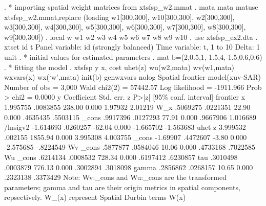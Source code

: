 . * importing spatial weight matrices from xtsfsp_w2.mmat
. mata mata matuse xtsfsp_w2.mmat,replace
(loading w1[300,300], w10[300,300], w2[300,300], w3[300,300], w4[300,300], w5[300,300], w6[300,300],
 w7[300,300], w8[300,300], w9[300,300])
{\smallskip}
. local w w1 w2 w3 w4 w5 w6 w7 w8 w9 w10
{\smallskip}
. use xtsfsp_ex2.dta
{\smallskip}
. xtset id t 
{\smallskip}
Panel variable: id (strongly balanced)
 Time variable: t, 1 to 10
         Delta: 1 unit
{\smallskip}
. * initial values for estimated parameters
. mat b=(2,0.5,1,-1.5,4,-1.5,0.6,0.6)
{\smallskip}
. * fitting the model
. xtsfsp y x, cost uhet(z) wu(w2,mata) wv(w1,mata) wxvars(x) wx(`w',mata) init(b) genwxvars nolog
{\smallskip}
Spatial frontier model(xuv-SAR)                       Number of obs =    3,000
                                                      Wald chi2(2)  = 57442.57
Log likelihood = -1911.966                            Prob > chi2   =   0.0000
{\smallskip}
           y {\VBAR} Coefficient  Std. err.      z    P>|z|     [95\% conf. interval]
frontier     {\VBAR}
           x {\VBAR}   1.995755   .0083855   238.00   0.000      1.97932     2.01219
         W_x {\VBAR}   .5069275   .0221351    22.90   0.000     .4635435    .5503115
       _cons {\VBAR}   .9917396   .0127293    77.91   0.000     .9667906    1.016689
    /lnsigv2 {\VBAR}  -1.614693   .0260257   -62.04   0.000    -1.665702   -1.563683
uhet         {\VBAR}
           z {\VBAR}   3.999532    .002155  1855.94   0.000     3.995308    4.003755
       _cons {\VBAR}   -1.69907   .4472607    -3.80   0.000    -2.575685   -.8224549
Wv           {\VBAR}
       _cons {\VBAR}   .5877877   .0584046    10.06   0.000     .4733168    .7022585
Wu           {\VBAR}
       _cons {\VBAR}   .6214134   .0008532   728.34   0.000     .6197412    .6230857
         tau {\VBAR}   .3010498   .0003879   776.13   0.000     .3002894    .3018098
       gamma {\VBAR}   .2856862   .0268157    10.65   0.000     .2323138    .3373429
Note: Wv:_cons and Wu:_cons are the transformed parameters;
      gamma and tau are their origin metrics in spatial components, repsectively.
      W_(x) represent Spatial Durbin terms W(x)
